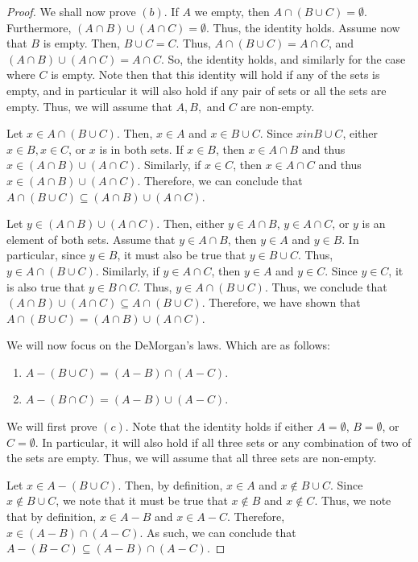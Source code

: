 \documentclass[12pt]{article}
\begin{document}
\begin{proof}
	We shall now prove \((b)\). If $A$ we empty, then $A \cap (B \cup C) = \emptyset$. Furthermore,
	$(A \cap B) \cup (A \cap C) = \emptyset$. Thus, the identity holds. Assume now that $B$ is empty.
	Then, $B \cup C = C$. Thus, $A \cap (B \cup C) = A \cap C$, and $(A \cap B) \cup (A \cap C) = A \cap C$.
	So, the identity holds, and similarly for the case where $C$ is empty. Note then that this identity 
	will hold if any of the sets is empty, and in particular it will also hold if any pair of sets or all
	the sets are empty. Thus, we will assume that $A, B,$ and $C$ are non-empty.
	
	Let $x \in A \cap (B \cup C)$. Then, $x \in A$ and $x \in B \cup C$. Since $x in B \cup C$, 
	either $x \in B, x \in C$, or $x$ is in both sets. If $x \in B$, then $x \in A \cap B$ and thus
	$x \in (A \cap B) \cup (A \cap C)$. Similarly, if $x \in C$, then $x \in A \cap C$ and thus 
	$x \in (A \cap B) \cup (A \cap C)$. Therefore, we can conclude that $A \cap (B \cup C) \subseteq 
	(A \cap B) \cup (A \cap C)$.
	
	Let $y \in (A \cap B) \cup (A \cap C)$. Then, either $y \in A \cap B$, $y \in A \cap C$, or 
	$y$ is an element of both sets. Assume that $y \in A \cap B$, then $y \in A$ and $y \in B$.
	In particular, since $y \in B$, it must also be true that $y \in B \cup C$. Thus,
	$y \in A \cap (B \cup C)$. Similarly, if $y \in A \cap C$, then $y \in A$ and $y \in C$.
	Since $y \in C$, it is also true that $y \in B \cap C$. Thus, $y \in A \cap (B \cup C)$.
	Thus, we conclude that $(A \cap B) \cup (A \cap C) \subseteq A \cap (B \cup C)$.
	Therefore, we have shown that \(A \cap (B \cup C) = (A \cap B) \cup (A \cap C)\). 
	
	We will now focus on the DeMorgan's laws. Which are as follows:
	\begin{enumerate}
		\item[(c)] $A - (B \cup C) = (A - B) \cap (A - C)$.
		\item[(d)] $A - (B \cap C) = (A - B) \cup (A - C)$.
	\end{enumerate}
	
	We will first prove $(c)$. Note that the identity holds if either $A = \emptyset$, $B = \emptyset$,
	or $C = \emptyset$. In particular, it will also hold if all three sets or any combination of two
	of the sets are empty. Thus, we will assume that all three sets are non-empty.
	
	Let $x \in A - (B \cup C)$. Then, by definition, $x \in A$ and $x \notin B \cup C$. Since 
	$x \notin B \cup C$, we note that it must be true that $x \notin B$ and $x \notin C$. 
	Thus, we note that by definition, $x \in A - B$ and $x \in A - C$. Therefore, $x \in (A - B) \cap 
	(A - C)$. As such, we can conclude that $A - (B - C) \subseteq (A - B) \cap (A - C)$.
	

\end{proof}
\end{document}
